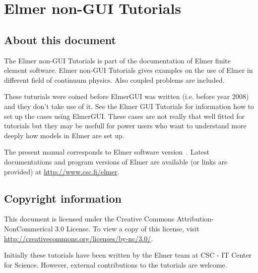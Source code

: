 \chapter*{Elmer non-GUI Tutorials}

\section*{About this document}

The Elmer non-GUI Tutorials is part of the documentation of 
Elmer finite element software.
Elmer non-GUI Tutorials gives examples on the use of Elmer in different field
of continuum physics. Also coupled problems are included. 

These tuturials were coined before ElmerGUI was written (i.e. before year 2008) and they don't take use of it. 
See the Elmer GUI Tutorials for information how to set up the cases using ElmerGUI.
These cases are not really that well fitted for tutorials but they may be usefull 
for power users who want to understand more deeply how models in Elmer are set up. 

The present manual
corresponds to Elmer software version~\elmerversion{}.
Latest documentations and program versions of Elmer are available (or links are provided) at 
\url{http://www.csc.fi/elmer}. 

\section*{Copyright information}

This document is licensed under the Creative Commons Attribution-NonCommerical 3.0 License. 
To view a copy of this license, visit \url{http://creativecommons.org/licenses/by-nc/3.0/}.

Initially these tutorials have been written by the Elmer team at CSC - IT Center for Science. 
However, external contributions to the tutorials are welcome. 


